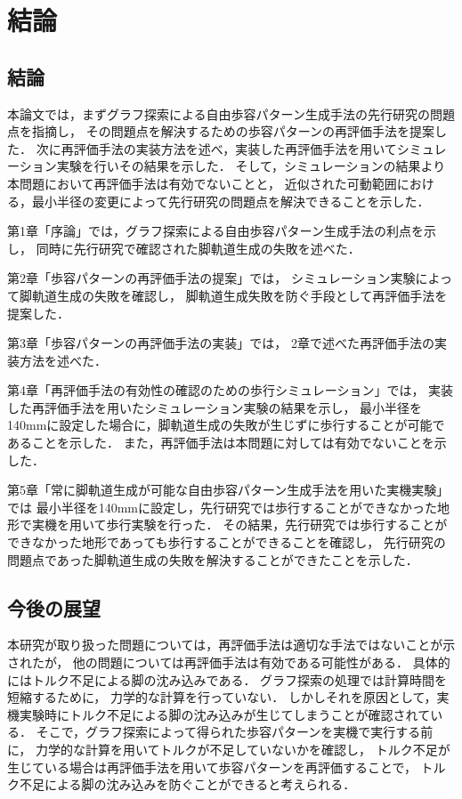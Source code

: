 ﻿

\chapter{結論}\label{chapter:結論}

\section{結論}

本論文では，まずグラフ探索による自由歩容パターン生成手法の先行研究の問題点を指摘し，
その問題点を解決するための歩容パターンの再評価手法を提案した．
次に再評価手法の実装方法を述べ，実装した再評価手法を用いてシミュレーション実験を行いその結果を示した．
そして，シミュレーションの結果より本問題において再評価手法は有効でないことと，
近似された可動範囲における，最小半径の変更によって先行研究の問題点を解決できることを示した．

第1章「序論」では，グラフ探索による自由歩容パターン生成手法の利点を示し，
同時に先行研究で確認された脚軌道生成の失敗を述べた．

第2章「歩容パターンの再評価手法の提案」では，
シミュレーション実験によって脚軌道生成の失敗を確認し，
脚軌道生成失敗を防ぐ手段として再評価手法を提案した．

第3章「歩容パターンの再評価手法の実装」では，
2章で述べた再評価手法の実装方法を述べた．

第4章「再評価手法の有効性の確認のための歩行シミュレーション」では，
実装した再評価手法を用いたシミュレーション実験の結果を示し，
最小半径を140mmに設定した場合に，脚軌道生成の失敗が生じずに歩行することが可能であることを示した．
また，再評価手法は本問題に対しては有効でないことを示した．

第5章「常に脚軌道生成が可能な自由歩容パターン生成手法を用いた実機実験」では
最小半径を140mmに設定し，先行研究では歩行することができなかった地形で実機を用いて歩行実験を行った．
その結果，先行研究では歩行することができなかった地形であっても歩行することができることを確認し，
先行研究の問題点であった脚軌道生成の失敗を解決することができたことを示した．

\section{今後の展望}
本研究が取り扱った問題については，再評価手法は適切な手法ではないことが示されたが，
他の問題については再評価手法は有効である可能性がある．
具体的にはトルク不足による脚の沈み込みである．
グラフ探索の処理では計算時間を短縮するために，
力学的な計算を行っていない．
しかしそれを原因として，実機実験時にトルク不足による脚の沈み込みが生じてしまうことが確認されている．
そこで，グラフ探索によって得られた歩容パターンを実機で実行する前に，
力学的な計算を用いてトルクが不足していないかを確認し，
トルク不足が生じている場合は再評価手法を用いて歩容パターンを再評価することで，
トルク不足による脚の沈み込みを防ぐことができると考えられる．

